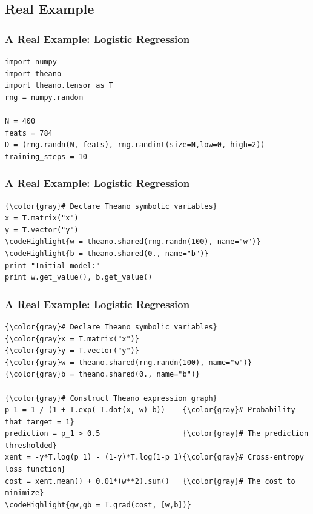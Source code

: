 \documentclass[a4paper,9pt]{beamer}
\begin{document}
\subsection{Real Example}

\begin{frame}[fragile]
  \frametitle{A Real Example: Logistic Regression}
\begin{Verbatim}[commandchars=\\\{\}]
import numpy
import theano
import theano.tensor as T
rng = numpy.random

N = 400
feats = 784
D = (rng.randn(N, feats), rng.randint(size=N,low=0, high=2))
training_steps = 10
\end{Verbatim}
\end{frame}

\begin{frame}[fragile]
  \frametitle{A Real Example: Logistic Regression}
\begin{Verbatim}[commandchars=\\\{\}]
{\color{gray}# Declare Theano symbolic variables}
x = T.matrix("x")
y = T.vector("y")
\codeHighlight{w = theano.shared(rng.randn(100), name="w")}
\codeHighlight{b = theano.shared(0., name="b")}
print "Initial model:"
print w.get_value(), b.get_value()
\end{Verbatim}
\end{frame}

\begin{frame}[fragile]
  \frametitle{A Real Example: Logistic Regression}
\begin{Verbatim}[commandchars=\\\{\}]
{\color{gray}# Declare Theano symbolic variables}
{\color{gray}x = T.matrix("x")}
{\color{gray}y = T.vector("y")}
{\color{gray}w = theano.shared(rng.randn(100), name="w")}
{\color{gray}b = theano.shared(0., name="b")}

{\color{gray}# Construct Theano expression graph}
p_1 = 1 / (1 + T.exp(-T.dot(x, w)-b))    {\color{gray}# Probability that target = 1}
prediction = p_1 > 0.5                   {\color{gray}# The prediction thresholded}
xent = -y*T.log(p_1) - (1-y)*T.log(1-p_1){\color{gray}# Cross-entropy loss function}
cost = xent.mean() + 0.01*(w**2).sum()   {\color{gray}# The cost to minimize}
\codeHighlight{gw,gb = T.grad(cost, [w,b])}
\end{Verbatim}
\end{frame}
\end{document}
